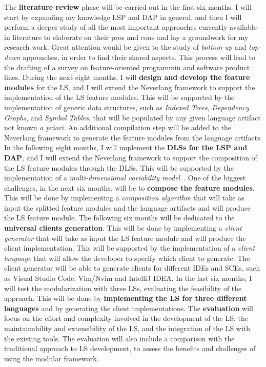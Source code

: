 The \textbf{literature review} phase will be carried out in the first six months. I will start by expanding my knowledge LSP and DAP in general, and then I will perform a deeper study of all the most important approaches currently available in literature to elaborate on their pros and cons and lay a groundwork for my research work. Great attention would be given to the study of \textit{bottom-up} and \textit{top-down} approaches, in order to find their shared aspects. This process will lead to the drafting of a survey on feature-oriented programmin and software product lines.
During the next eight months, I will \textbf{design and develop the feature modules} for the LS, and I will extend the Neverlang framework to support the implementation of the LS feature modules. This will be supported by the implementation of generic data structures, such as \textit{Indexed Trees}, \textit{Dependency Graphs}, and \textit{Symbol Tables}, that will be populated by any given language artifact not known \textit{a priori}. An additional compilation step will be added to the Neverlang framework to generate the feature modules from the language artifacts.
In the following eight months, I will implement the \textbf{DLSs for the LSP and DAP}, and I will extend the Neverlang framework to support the composition of the LS feature modules through the DLSs. This will be supported by the implementation of a \textit{multi-dimensional variability model}~\cite{Rosenmuller11}.
One of the biggest challenges, in the next six months, will be to \textbf{compose the feature modules}. This will be done by implementing a \textit{composition algorithm} that will take as input the splitted feature modules and the language artifacts and will produce the LS feature module.
The following six months will be dedicated to the \textbf{universal clients generation}. This will be done by implementing a \textit{client generator} that will take as input the LS feature module and will produce the client implementation. This will be supported by the implementation of a \textit{client language} that will allow the developer to specify which client to generate. The client generator will be able to generate clients for different IDEs and SCEs, such as Visual Studio Code, Vim/Nvim and IntelliJ IDEA.
In the last six months, I will test the modularization with three LSs, evaluating the feasibility of the approach. This will be done by \textbf{implementing the LS for three different languages} and by generating the client implementations. The \textbf{evaluation} will focus on the effort and complexity involved in the development of the LS, the maintainability and extensibility of the LS, and the integration of the LS with the existing tools. The evaluation will also include a comparison with the traditional approach to LS development, to assess the benefits and challenges of using the modular framework.

